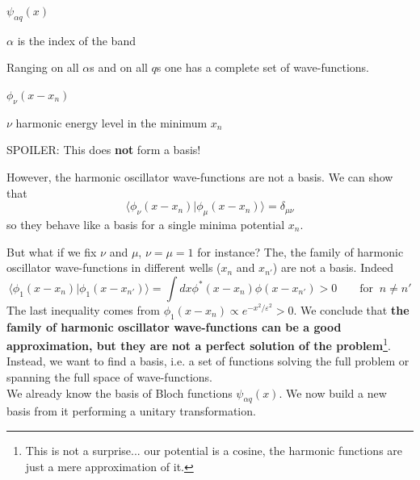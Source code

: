 \begin{tcolorbox}
\begin{minipage}{0.45\textwidth}
\begin{center}
    $\psi_{\alpha q}(x)$

    $\alpha$ is the index of the band
\end{center}

    Ranging on all $\alpha$s and on all $q$s one has a complete set of wave-functions.
\end{minipage}\hfill
\begin{minipage}{0.45\textwidth}
\begin{center}
    $\phi_\nu(x - x_n)$

    $\nu$ harmonic energy level in the minimum $x_n$
\end{center}

    SPOILER: This does \textbf{not} form a basis!
\end{minipage}
\end{tcolorbox}



However, the harmonic oscillator wave-functions are not a basis. We can show that
$$\langle \phi_\nu (x-x_n) | \phi_\mu(x-x_n) \rangle = \delta_{\mu\nu}$$
so they behave like a basis for a single minima potential $x_n$.

But what if we fix $\nu$ and $\mu$, $\nu = \mu = 1$ for instance? The, the family of harmonic oscillator wave-functions in different wells ($x_n$ and $x_{n'}$) are not a basis. Indeed
$$\langle \phi_1 (x-x_n) | \phi_1(x-x_{n'}) \rangle
= \int dx \phi^*(x-x_n)\phi(x-x_{n'}) > 0 \qquad \text{for}\;\; n \neq n'$$
The last inequality comes from 
$\phi_1 (x-x_n) \propto e^{-x^2/\varepsilon^2} > 0$.
%
We conclude that \textbf{the family of harmonic oscillator wave-functions can be a good approximation, but they are not a perfect solution of the problem}\footnote{
    This is not a surprise... our potential is a cosine, the harmonic functions are just a mere approximation of it.}.
%
Instead, we want to find a basis, i.e. a set of functions solving the full problem or spanning the full space of wave-functions.\\


We already know the basis of Bloch functions $\psi_{\alpha q}(x)$. We now build a new basis from it performing a unitary transformation.\\

